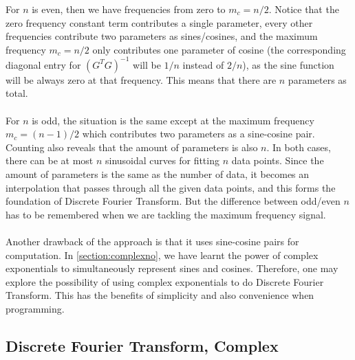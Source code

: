 For $n$ is even, then we have frequencies from zero to $m_c = n/2$. Notice that the zero frequency constant term contributes a single parameter, every other frequencies contribute two parameters as sines/cosines, and the maximum frequency $m_c = n/2$ only contributes one parameter of cosine (the corresponding diagonal entry for $(G^TG)^{-1}$ will be $1/n$ instead of $2/n$), as the sine function will be always zero at that frequency. This means that there are $n$ parameters as total.\\
\\
For $n$ is odd, the situation is the same except at the maximum frequency $m_c = (n-1)/2$ which contributes two parameters as a sine-cosine pair. Counting also reveals that the amount of parameters is also $n$. In both cases, there can be at most $n$ sinusoidal curves for fitting $n$ data points. Since the amount of parameters is the same as the number of data, it becomes an interpolation that passes through all the given data points, and this forms the foundation of Discrete Fourier Transform. But the difference between odd/even $n$ has to be remembered when we are tackling the maximum frequency signal. \\
\\
Another drawback of the approach is that it uses sine-cosine pairs for computation. In \autoref{section:complexno}, we have learnt the power of complex exponentials to simultaneously represent sines and cosines. Therefore, one may explore the possibility of using complex exponentials to do Discrete Fourier Transform. This has the benefits of simplicity and also convenience when programming.

\subsection{Discrete Fourier Transform, Complex}

